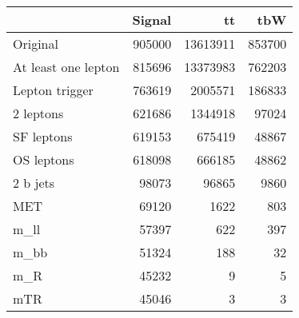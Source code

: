 \begin{tabular}{lrrr}
\toprule
{} &  Signal &        tt &     tbW \\
\midrule
Original            &  905000 &  13613911 &  853700 \\
At least one lepton &  815696 &  13373983 &  762203 \\
Lepton trigger      &  763619 &   2005571 &  186833 \\
2 leptons           &  621686 &   1344918 &   97024 \\
SF leptons          &  619153 &    675419 &   48867 \\
OS leptons          &  618098 &    666185 &   48862 \\
2 b jets            &   98073 &     96865 &    9860 \\
MET                 &   69120 &      1622 &     803 \\
m_ll                &   57397 &       622 &     397 \\
m_bb                &   51324 &       188 &      32 \\
m_R                 &   45232 &         9 &       5 \\
mTR                 &   45046 &         3 &       3 \\
\bottomrule
\end{tabular}
